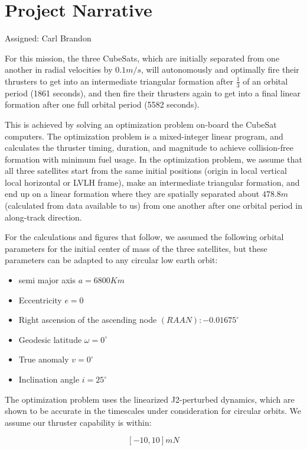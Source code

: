 \section{Project Narrative}
Assigned: Carl Brandon

For this mission, the three CubeSats, which are initially separated
from one another in radial velocities by $0.1 m/s$, will autonomously
and optimally fire their thrusters to get into an intermediate
triangular formation after $\frac{1}{3}$ of an orbital period (1861
seconds), and then fire their thrusters again to get into a final
linear formation after one full orbital period (5582 seconds).

This is achieved by solving an optimization problem on-board the
CubeSat computers. The optimization problem is a mixed-integer linear
program, and calculates the thruster timing, duration, and magnitude
to achieve collision-free formation with minimum fuel usage. In the
optimization problem, we assume that all three satellites start from
the same initial positions (origin in local vertical local horizontal
or LVLH frame), make an intermediate triangular formation, and end up
on a linear formation where they are spatially separated about $478.8m$
(calculated from data available to us) from one another after one
orbital period in along-track direction.

For the calculations and figures that follow, we assumed the following
orbital parameters for the initial center of mass of the three
satellites, but these parameters can be adapted to any circular low
earth orbit:

\begin{itemize}
  \item semi major axis $a = 6800 Km$
  \item Eccentricity $e = 0$
  \item Right ascension of the ascending node $(RAAN):-0.01675^{\circ}$
  \item Geodesic latitude $\omega = 0^{\circ}$
  \item True anomaly $v = 0^{\circ}$
  \item Inclination angle $i = 25^{\circ}$
\end{itemize}

The optimization problem uses the linearized J2-perturbed dynamics,
which are shown to be accurate in the timescales under consideration
for circular orbits. We assume our thruster capability is within:

\[[-10, 10] mN\]

